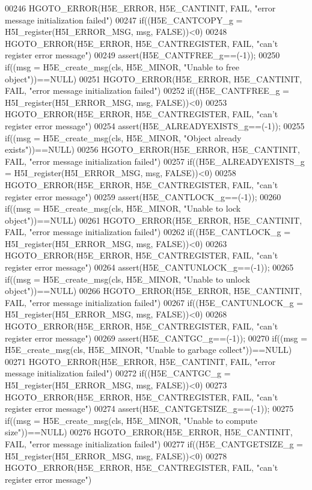 \begin{DoxyCode}
00246     HGOTO\_ERROR(H5E\_ERROR, H5E\_CANTINIT, FAIL, "error message initialization failed")
00247 if((H5E\_CANTCOPY\_g = H5I\_register(H5I\_ERROR\_MSG, msg, FALSE))<0)
00248     HGOTO\_ERROR(H5E\_ERROR, H5E\_CANTREGISTER, FAIL, "can't register error message")
00249 assert(H5E\_CANTFREE\_g==(-1));
00250 if((msg = H5E\_create\_msg(cls, H5E\_MINOR, "Unable to free \textcolor{keywordtype}{object}"))==NULL)
00251     HGOTO\_ERROR(H5E\_ERROR, H5E\_CANTINIT, FAIL, "error message initialization failed")
00252 if((H5E\_CANTFREE\_g = H5I\_register(H5I\_ERROR\_MSG, msg, FALSE))<0)
00253     HGOTO\_ERROR(H5E\_ERROR, H5E\_CANTREGISTER, FAIL, "can't register error message")
00254 assert(H5E\_ALREADYEXISTS\_g==(-1));
00255 if((msg = H5E\_create\_msg(cls, H5E\_MINOR, "Object already exists"))==NULL)
00256     HGOTO\_ERROR(H5E\_ERROR, H5E\_CANTINIT, FAIL, "error message initialization failed")
00257 if((H5E\_ALREADYEXISTS\_g = H5I\_register(H5I\_ERROR\_MSG, msg, FALSE))<0)
00258     HGOTO\_ERROR(H5E\_ERROR, H5E\_CANTREGISTER, FAIL, "can't register error message")
00259 assert(H5E\_CANTLOCK\_g==(-1));
00260 if((msg = H5E\_create\_msg(cls, H5E\_MINOR, "Unable to lock \textcolor{keywordtype}{object}"))==NULL)
00261     HGOTO\_ERROR(H5E\_ERROR, H5E\_CANTINIT, FAIL, "error message initialization failed")
00262 if((H5E\_CANTLOCK\_g = H5I\_register(H5I\_ERROR\_MSG, msg, FALSE))<0)
00263     HGOTO\_ERROR(H5E\_ERROR, H5E\_CANTREGISTER, FAIL, "can't register error message")
00264 assert(H5E\_CANTUNLOCK\_g==(-1));
00265 if((msg = H5E\_create\_msg(cls, H5E\_MINOR, "Unable to unlock \textcolor{keywordtype}{object}"))==NULL)
00266     HGOTO\_ERROR(H5E\_ERROR, H5E\_CANTINIT, FAIL, "error message initialization failed")
00267 if((H5E\_CANTUNLOCK\_g = H5I\_register(H5I\_ERROR\_MSG, msg, FALSE))<0)
00268     HGOTO\_ERROR(H5E\_ERROR, H5E\_CANTREGISTER, FAIL, "can't register error message")
00269 assert(H5E\_CANTGC\_g==(-1));
00270 if((msg = H5E\_create\_msg(cls, H5E\_MINOR, "Unable to garbage collect"))==NULL)
00271     HGOTO\_ERROR(H5E\_ERROR, H5E\_CANTINIT, FAIL, "error message initialization failed")
00272 if((H5E\_CANTGC\_g = H5I\_register(H5I\_ERROR\_MSG, msg, FALSE))<0)
00273     HGOTO\_ERROR(H5E\_ERROR, H5E\_CANTREGISTER, FAIL, "can't register error message")
00274 assert(H5E\_CANTGETSIZE\_g==(-1));
00275 if((msg = H5E\_create\_msg(cls, H5E\_MINOR, "Unable to compute size"))==NULL)
00276     HGOTO\_ERROR(H5E\_ERROR, H5E\_CANTINIT, FAIL, "error message initialization failed")
00277 if((H5E\_CANTGETSIZE\_g = H5I\_register(H5I\_ERROR\_MSG, msg, FALSE))<0)
00278     HGOTO\_ERROR(H5E\_ERROR, H5E\_CANTREGISTER, FAIL, "can't register error message")

\end{DoxyCode}
